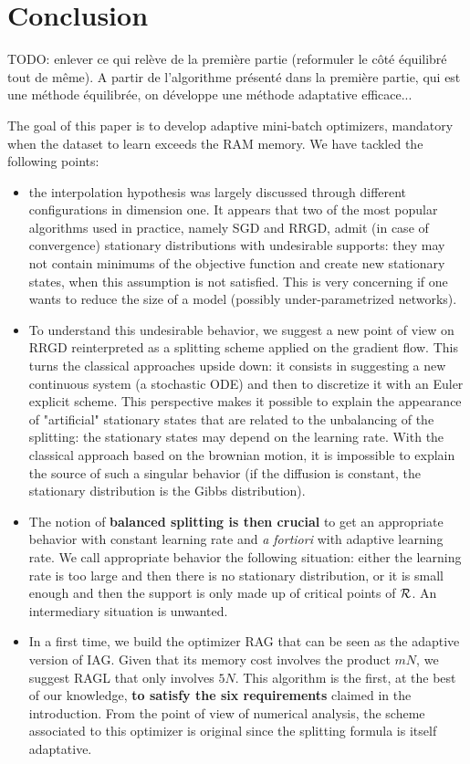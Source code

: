 \section{Conclusion}
\label{section_conclusion}

TODO: enlever ce qui relève de la première partie (reformuler le côté équilibré tout de même).
A partir de l'algorithme présenté dans la première partie, qui est une méthode équilibrée, on développe une méthode adaptative efficace...

The goal of this paper is to develop adaptive mini-batch optimizers, mandatory when the dataset to learn exceeds the RAM memory. We have tackled the following points:
\begin{itemize}
	\item the interpolation hypothesis was largely discussed through different configurations in dimension one. It appears that two of the most popular algorithms used in practice, namely SGD and RRGD, admit (in case of convergence) stationary distributions with undesirable supports: they may not contain minimums of the objective function and create new stationary states, when this assumption is not satisfied. This is very concerning if one wants to reduce the size of a model (possibly under-parametrized networks).
	\item To understand this undesirable behavior, we suggest a new point of view on RRGD reinterpreted as a splitting scheme applied on the gradient flow. This turns the
          classical approaches upside down: it consists in suggesting a new continuous system (a stochastic ODE) and then to discretize it with an Euler explicit scheme. This perspective makes it possible to explain the appearance of "artificial" stationary states that are related to the unbalancing of the splitting: the stationary states may depend on the learning rate. With the classical approach based on the brownian motion, it is impossible to explain the source of such a singular behavior (if the diffusion is constant, the stationary distribution is the Gibbs distribution).
        \item The notion of \textbf{balanced splitting is then crucial} to get an appropriate behavior with constant learning rate and {\em a fortiori} with adaptive learning rate. We call appropriate behavior the following situation: either the learning rate is too large and then there is no stationary distribution, or it is small enough and then the support is only made up of critical points of $\mathcal{R}$. An intermediary situation is unwanted.
	\item In a first time, we build the optimizer RAG that can be seen as the adaptive version of IAG. Given that its memory cost involves the product $mN$, we suggest RAGL that only involves $5N$. This algorithm is the first, at the best of our knowledge, \textbf{to satisfy the six requirements} claimed in the introduction. From the point of view of numerical analysis, the scheme associated to this optimizer is original since the splitting formula is itself adaptative.

\end{itemize}
